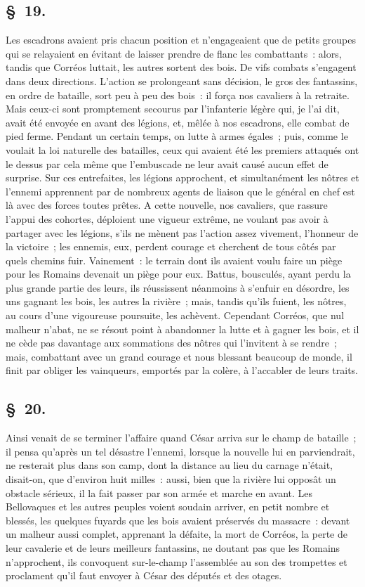 \documentclass[french,twoside]{book} %
\begin{document}
\subsection[{§ 19.}]{ \textsc{§ 19.} }
\noindent Les escadrons avaient pris chacun position et n’engageaient que de petits groupes qui se relayaient en évitant de laisser prendre de flanc les combattants : alors, tandis que Corréos luttait, les autres sortent des bois. De vifs combats s’engagent dans deux directions. L'action se prolongeant sans décision, le gros des fantassins, en ordre de bataille, sort peu à peu des bois : il força nos cavaliers à la retraite. Mais ceux-ci sont promptement secourus par l’infanterie légère qui, je l’ai dit, avait été envoyée en avant des légions, et, mêlée à nos escadrons, elle combat de pied ferme. Pendant un certain temps, on lutte à armes égales ; puis, comme le voulait la loi naturelle des batailles, ceux qui avaient été les premiers attaqués ont le dessus par cela même que l’embuscade ne leur avait causé aucun effet de surprise. Sur ces entrefaites, les légions approchent, et simultanément les nôtres et l’ennemi apprennent par de nombreux agents de liaison que le général en chef est là avec des forces toutes prêtes. A cette nouvelle, nos cavaliers, que rassure l’appui des cohortes, déploient une vigueur extrême, ne voulant pas avoir à partager avec les légions, s’ils ne mènent pas l’action assez vivement, l’honneur de la victoire ; les ennemis, eux, perdent courage et cherchent de tous côtés par quels chemins fuir. Vainement : le terrain dont ils avaient voulu faire un piège pour les Romains devenait un piège pour eux. Battus, bousculés, ayant perdu la plus grande partie des leurs, ils réussissent néanmoins à s’enfuir en désordre, les uns gagnant les bois, les autres la rivière ; mais, tandis qu’ils fuient, les nôtres, au cours d’une vigoureuse poursuite, les achèvent. Cependant Corréos, que nul malheur n’abat, ne se résout point à abandonner la lutte et à gagner les bois, et il ne cède pas davantage aux sommations des nôtres qui l’invitent à se rendre ; mais, combattant avec un grand courage et nous blessant beaucoup de monde, il finit par obliger les vainqueurs, emportés par la colère, à l’accabler de leurs traits.
\subsection[{§ 20.}]{ \textsc{§ 20.} }
\noindent Ainsi venait de se terminer l’affaire quand César arriva sur le champ de bataille ; il pensa qu’après un tel désastre l’ennemi, lorsque la nouvelle lui en parviendrait, ne resterait plus dans son camp, dont la distance au lieu du carnage n’était, disait-on, que d’environ huit milles : aussi, bien que la rivière lui opposât un obstacle sérieux, il la fait passer par son armée et marche en avant. Les Bellovaques et les autres peuples voient soudain arriver, en petit nombre et blessés, les quelques fuyards que les bois avaient préservés du massacre : devant un malheur aussi complet, apprenant la défaite, la mort de Corréos, la perte de leur cavalerie et de leurs meilleurs fantassins, ne doutant pas que les Romains n’approchent, ils convoquent sur-le-champ l’assemblée au son des trompettes et proclament qu’il faut envoyer à César des députés et des otages.
\end{document}
